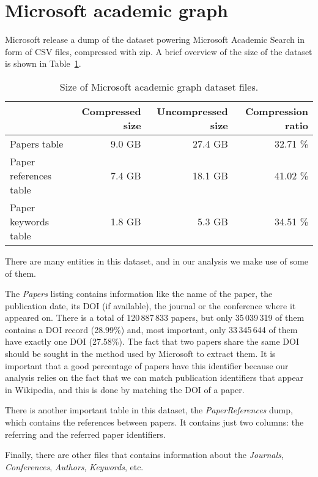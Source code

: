 \section{Microsoft academic graph}
\label{sec:mag_dataset}
Microsoft release a dump of the dataset powering Microsoft Academic Search in form of CSV files, compressed with zip.
A brief overview of the size of the dataset is shown in Table~\ref{tbl:mag_size}.

\begin{table}[h]
\centering
\caption{Size of Microsoft academic graph dataset files.}
\label{tbl:mag_size}
\begin{tabular}{@{}lrrr@{}}
\multicolumn{1}{c}{\textbf{}} & \textbf{Compressed size} & \textbf{Uncompressed size} & \textbf{Compression ratio} \\ \midrule
Papers table                &      9.0 GB &    27.4 GB & 32.71 \% \\
Paper references table      &      7.4 GB &    18.1 GB & 41.02 \% \\
Paper keywords table        &      1.8 GB &     5.3 GB & 34.51 \%
\end{tabular}
\end{table}

There are many entities in this dataset, and in our analysis we make use of some of them.

The \emph{Papers} listing contains information like the name of the paper, the publication date, its \ac{DOI} (if available), the journal or the conference where it appeared on.
There is a total of 120\,887\,833 papers, but only 35\,039\,319 of them contains a \ac{DOI} record (28.99\%) and, most important, only 33\,345\,644 of them have exactly one \ac{DOI} (27.58\%).
The fact that two papers share the same \ac{DOI} should be sought in the method used by Microsoft to extract them.
It is important that a good percentage of papers have this identifier because our analysis relies on the fact that we can match publication identifiers that appear in Wikipedia, and this is done by matching the \ac{DOI} of a paper.

There is another important table in this dataset, the \emph{PaperReferences} dump, which contains the references between papers.
It contains just two columns: the referring and the referred paper identifiers.

Finally, there are other files that contains information about the \emph{Journals}, \emph{Conferences}, \emph{Authors}, \emph{Keywords}, etc.




